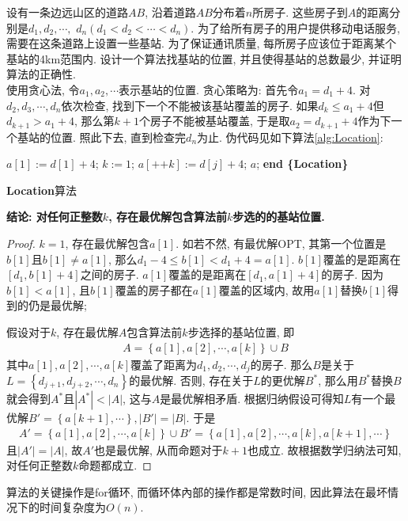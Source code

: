 \documentclass{article}
\begin{document}
\begin{homeworkProblem}
	设有一条边远山区的道路$AB$, 沿着道路$AB$分布着$n$所房子. 这些房子到$A$的距离分别是$d_1,d_2,\cdots,$
	$d_n(d_1<d_2<\cdots<d_n)$. 为了给所有房子的用户提供移动电话服务, 需要在这条道路上设置一些基站. 为了保证通讯质量, 每所房子应该位于距离某个基站的4km范围内. 设计一个算法找基站的位置, 并且使得基站的总数最少, 并证明算法的正确性.
	\\

	\solution 使用贪心法, 令$a_1,a_2,\cdots$表示基站的位置. 贪心策略为: 首先令$a_1=d_1+4$. 对$d_2,d_3,\cdots,d_n$依次检查, 找到下一个不能被该基站覆盖的房子. 如果$d_k\leq a_1+4$但$d_{k+1}>a_1+4$, 那么第$k+1$个房子不能被基站覆盖, 于是取$a_2=d_{k+1}+4$作为下一个基站的位置. 照此下去, 直到检查完$d_n$为止. 伪代码见如下算法\ref{alg:Location}:
	\begin{algorithm}[H]
		\begin{algorithmic}[1]
		\State $a[1]:=d[1]+4$; $k:=1$;
				\State $a[\text{++}k]:=d[j]+4$;
			\EndIf
		\EndFor
		\State \Return $a$;
		\State \textbf{end \{Location\}}
		\end{algorithmic}
		\caption{\textbf{Location}算法}
		\label{alg:Location}
	\end{algorithm}
	\textbf{结论: 对任何正整数$k$, 存在最优解包含算法前$k$步选的的基站位置.}
	\begin{proof}
		$k=1$, 存在最优解包含$a[1]$. 如若不然, 有最优解OPT, 其第一个位置是$b[1]$且$b[1]\neq a[1]$, 那么$d_1-4\leq b[1] <d_1+4=a[1]$. $b[1]$覆盖的是距离在$[d_1,b[1]+4]$之间的房子. $a[1]$覆盖的是距离在$[d_1,a[1]+4]$的房子. 因为$b[1]<a[1]$, 且$b[1]$覆盖的房子都在$a[1]$覆盖的区域内, 故用$a[1]$替换$b[1]$得到的仍是最优解;

		假设对于$k$, 存在最优解$A$包含算法前$k$步选择的基站位置, 即
		\begin{align}
			A=\left\{ a\left[ 1 \right] ,a\left[ 2 \right] ,\cdots ,a\left[ k \right] \right\} \cup B
		\end{align}
		其中$a[1],a[2],\cdots,a[k]$覆盖了距离为$d_1,d_2,\cdots,d_j$的房子. 那么$B$是关于$L=\left\{ d_{j+1},d_{j+2},\cdots ,d_n \right\} $的最优解. 否则, 存在关于$L$的更优解$B^{\ast}$, 那么用$B^{\ast}$替换$B$就会得到$A^{\ast}$且$\left| A^{\ast} \right|<\left| A \right|$, 这与$A$是最优解相矛盾. 根据归纳假设可得知$L$有一个最优解$B'=\left\{ a\left[ k+1 \right] ,\cdots \right\} ,\left| B' \right|=\left| B \right|$. 于是
		\begin{align}
			A'=\left\{ a\left[ 1 \right] ,a\left[ 2 \right] ,\cdots ,a\left[ k \right] \right\} \cup B'=\left\{ a\left[ 1 \right] ,a\left[ 2 \right] ,\cdots ,a\left[ k \right] ,a\left[ k+1 \right] ,\cdots \right\} 
		\end{align}
		且$\left| A' \right|=\left| A \right|$, 故$A'$也是最优解, 从而命题对于$k+1$也成立. 故根据数学归纳法可知, 对任何正整数$k$命题都成立.
	\end{proof}
	算法的关键操作是for循环, 而循环体內部的操作都是常数时间, 因此算法在最坏情况下的时间复杂度为$O(n)$.
\end{homeworkProblem}
\end{document}
